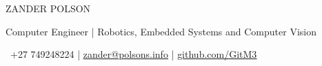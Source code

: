 \documentclass[10pt,a4paper]{article}
\begin{document}
\fontsize{10}{10.8}\selectfont

{\color{cvblue}\fontsize{20.5}{21}\selectfont ZANDER POLSON}\par
\vspace{0.12em}
{\fontsize{7.9}{8.6}\selectfont Computer Engineer | Robotics, Embedded Systems and Computer Vision}\par
\vspace{0.05em}
{\fontsize{7.8}{8.5}\selectfont
	\faWhatsapp\ +27 749248224 |
	\href{mailto:zander@polsons.info}{\underline{zander@polsons.info}} |
	\href{https://github.com/GitM3}{\underline{github.com/GitM3}}}\par

\vspace{0.05em} %

\end{document}

